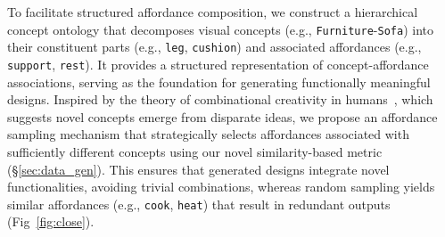 
To facilitate structured affordance composition, we construct a hierarchical concept ontology that decomposes visual concepts (e.g., \texttt{Furniture}-\texttt{Sofa}) into their constituent parts (e.g., \texttt{leg}, \texttt{cushion}) and associated affordances (e.g., \texttt{support}, \texttt{rest}). It provides a structured representation of concept-affordance associations, serving as the foundation for generating functionally meaningful designs. Inspired by the theory of combinational creativity in humans~\cite{Han2018THECD}, which suggests novel concepts emerge from disparate ideas, we propose an affordance sampling mechanism that strategically selects affordances associated with sufficiently different concepts using our novel similarity-based metric (\S\ref{sec:data_gen}). This ensures that generated designs integrate novel functionalities, avoiding trivial combinations, whereas random sampling yields similar affordances (e.g., \texttt{cook}, \texttt{heat}) that result in redundant outputs (Fig~\ref{fig:close}). 

